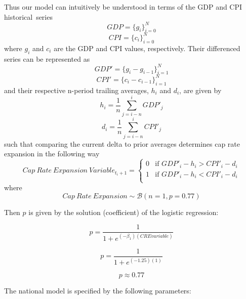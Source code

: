 \documentclass[jrfm,article,accept,oneauthor,pdftex]{Definitions/mdpi}
\begin{document}
Thus our model can intuitively be understood in terms of the GDP and CPI historical~series
\begin{equation}
GDP = \{g_i\}_{i=0}^N 
\end{equation}
\begin{equation}
CPI = \{c_i\}_{i=0}^N 
\end{equation}
where $g_i$ and $c_i$ are the GDP and CPI values, respectively.
Their differenced series can be represented as
\begin{equation}
GDP' = \{g_i-g_{i-1}\}_{i=1}^N 
\end{equation}
\begin{equation}
CPI' = \{c_i-c_{i-1}\}_{i=1}^N 
\end{equation}
and their respective n-period trailing averages, $h_i$ and $d_i$, are given by 
\begin{equation}
h_i=\frac{1}{n} \sum_{j=i-n}^{i}GDP'_j
\end{equation}
\begin{equation}
d_i=\frac{1}{n} \sum_{j=i-n}^{i}CPI'_j
\end{equation}
such that comparing the current delta to prior averages determines cap rate expansion in the following way
\begin{equation}
  Cap\: Rate\:Expansion\:Variable_{t_i+1} =
  \begin{cases}
    0 & \text{if $GDP'_i-h_i > CPI'_i-d_i $} \\
    1 & \text{if $GDP'_i-h_i < CPI'_i-d_i $} \\
  \end{cases}
\end{equation}
where 
\begin{equation}
  Cap\:Rate\:Expansion \sim \mathcal{B}(n=1,p=0.77)  
\end{equation}

Then $p$ is given by the solution (coefficient) of the logistic regression:

\begin{equation}
p=\frac{1}{1+e^{(-\beta_1)(CRE variable)}}
\end{equation}

\begin{equation}
p=\frac{1}{1+e^{(-1.25)(1)}}
\end{equation}

\begin{equation}
p \approx 0.77
\end{equation}

The national model is specified by the following parameters:
\end{document}
